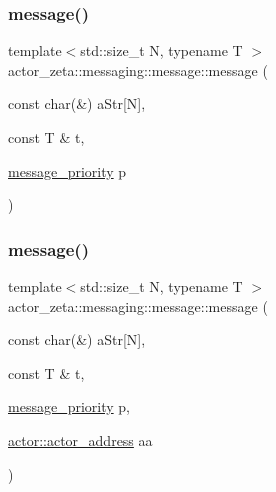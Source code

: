\mbox{\label{classactor__zeta_1_1messaging_1_1message_a0c8be6b9a9cba1a7a2142f031cdcbfbe}} 
\subsubsection{\texorpdfstring{message()}{message()}\hspace{0.1cm}{\footnotesize\ttfamily [6/11]}}
{\footnotesize\ttfamily template$<$std\+::size\+\_\+t N, typename T $>$ \\
actor\+\_\+zeta\+::messaging\+::message\+::message (\begin{DoxyParamCaption}\item[{const char(\&)}]{a\+Str\mbox{[}\+N\mbox{]},  }\item[{const T \&}]{t,  }\item[{\hyperlink{namespaceactor__zeta_1_1messaging_a1b4c4b3ab625eb033c15da4fbe9c4a89}{message\+\_\+priority}}]{p }\end{DoxyParamCaption})\hspace{0.3cm}{\ttfamily [inline]}}

\mbox{\label{classactor__zeta_1_1messaging_1_1message_abee9c14df4e91017a6f377d916409854}} 
\subsubsection{\texorpdfstring{message()}{message()}\hspace{0.1cm}{\footnotesize\ttfamily [7/11]}}
{\footnotesize\ttfamily template$<$std\+::size\+\_\+t N, typename T $>$ \\
actor\+\_\+zeta\+::messaging\+::message\+::message (\begin{DoxyParamCaption}\item[{const char(\&)}]{a\+Str\mbox{[}\+N\mbox{]},  }\item[{const T \&}]{t,  }\item[{\hyperlink{namespaceactor__zeta_1_1messaging_a1b4c4b3ab625eb033c15da4fbe9c4a89}{message\+\_\+priority}}]{p,  }\item[{\hyperlink{classactor__zeta_1_1actor_1_1actor__address}{actor\+::actor\+\_\+address}}]{aa }\end{DoxyParamCaption})\hspace{0.3cm}{\ttfamily [inline]}}

